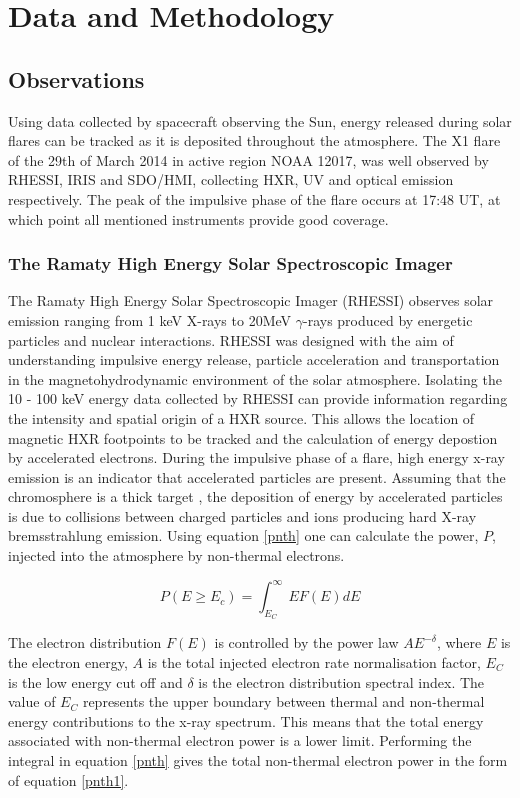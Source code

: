\section{Data and Methodology}
\subsection{Observations}
Using data collected by spacecraft observing the Sun, energy released during solar flares can be tracked as it is deposited throughout the atmosphere. The X1 flare of the 29th of March 2014 in active region NOAA 12017, was well observed by RHESSI, IRIS and SDO/HMI, collecting HXR, UV and optical emission respectively. The peak of the impulsive phase of the flare occurs at 17:48 UT, at which point all mentioned instruments provide good coverage. 

\subsubsection{The Ramaty High Energy Solar Spectroscopic Imager}
The Ramaty High Energy Solar Spectroscopic Imager (RHESSI) observes solar emission ranging from 1 keV X-rays to 20MeV $\gamma$-rays produced by energetic particles and nuclear interactions. RHESSI was designed with the aim of understanding impulsive energy release, particle acceleration and transportation in the magnetohydrodynamic environment of the solar atmosphere. Isolating the 10 - 100 keV energy data collected by RHESSI can provide information regarding the intensity and spatial origin of a HXR source. This allows the location of magnetic HXR footpoints to be tracked and the calculation of energy depostion by accelerated electrons. During the impulsive phase of a flare, high energy x-ray emission is an indicator that accelerated particles are present. Assuming that the chromosphere is a thick target \citep{1971SoPh...18..489B}, the deposition of energy by accelerated particles is due to collisions between charged particles and ions producing hard X-ray bremsstrahlung emission. Using equation \ref{pnth} one can calculate the power, $P$, injected into the atmosphere by non-thermal electrons.  
 
\begin{equation}\label{pnth}
P(E \geq E_{c}) = \int_{E_{C}}^{\infty} EF(E)dE
\end{equation}

The electron distribution $F(E)$ is controlled by the power law $AE^{-\delta}$, where $E$ is the electron energy, $A$ is the total injected electron rate normalisation factor, $E_{C}$ is the low energy cut off and $\delta$ is the electron distribution spectral index. The value of $E_{C}$ represents the upper boundary between thermal and non-thermal energy contributions to the x-ray spectrum. This means that the total energy associated with non-thermal electron power is a lower limit. Performing the integral in equation \ref{pnth} gives the total non-thermal electron power in the form of equation \ref{pnth1}.

